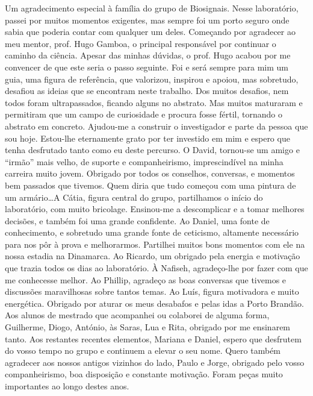 \begin{ntacknowledgements}
Um agradecimento especial à família do grupo de Biosignais. Nesse laboratório, passei por muitos momentos exigentes, mas sempre foi um porto seguro onde sabia que poderia contar com qualquer um deles. Começando por agradecer ao meu mentor, prof. Hugo Gamboa, o principal responsável por continuar o caminho da ciência. Apesar das minhas dúvidas, o prof. Hugo acabou por me convencer de que este seria o passo seguinte. Foi e será sempre para mim um guia, uma figura de referência, que valorizou, inspirou e apoiou, mas sobretudo, desafiou as ideias que se encontram neste trabalho. Dos muitos desafios, nem todos foram ultrapassados, ficando alguns no abstrato. Mas muitos maturaram e permitiram que um campo de curiosidade e procura fosse fértil, tornando o abstrato em concreto. Ajudou-me a construir o investigador e parte da pessoa que sou hoje. Estou-lhe eternamente grato por ter investido em mim e espero que tenha desfrutado tanto como eu deste percurso. O David, tornou-se um amigo e “irmão” mais velho, de suporte e companheirismo, imprescindível na minha carreira muito jovem. Obrigado por todos os conselhos, conversas, e momentos bem passados que tivemos. Quem diria que tudo começou com uma pintura de um armário…A Cátia, figura central do grupo, partilhamos o início do laboratório, com muito bricolage. Ensinou-me a descomplicar e a tomar melhores decisões, e também foi uma grande confidente. Ao Daniel, uma fonte de conhecimento, e sobretudo uma grande fonte de ceticismo, altamente necessário para nos pôr à prova e melhorarmos. Partilhei muitos bons momentos com ele na nossa estadia na Dinamarca. Ao Ricardo, um obrigado pela energia e motivação que trazia todos os dias ao laboratório. À Nafiseh, agradeço-lhe por fazer com que me conhecesse melhor. Ao Phillip, agradeço as boas conversas que tivemos e discussões maravilhosas sobre tantos temas. Ao Luís, figura motivadora e muito energética. Obrigado por aturar os meus desabafos e pelas idas a Porto Brandão. Aos alunos de mestrado que acompanhei ou colaborei de alguma forma, Guilherme, Diogo, António, às Saras, Lua e Rita, obrigado por me ensinarem tanto. Aos restantes recentes elementos, Mariana e Daniel, espero que desfrutem do vosso tempo no grupo e continuem a elevar o seu nome. Quero também agradecer aos nossos antigos vizinhos do lado, Paulo e Jorge, obrigado pelo vosso companheirismo, boa disposição e constante motivação. Foram peças muito importantes ao longo destes anos.

\end{ntacknowledgements}
